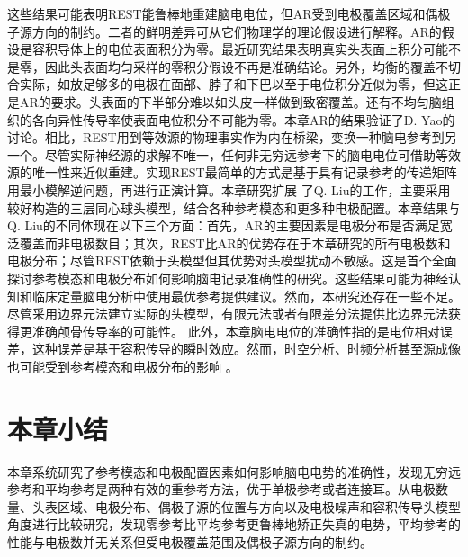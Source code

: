 这些结果可能表明REST能鲁棒地重建脑电电位，但AR受到电极覆盖区域和偶极子源方向的制约。二者的鲜明差异可从它们物理学的理论假设进行解释。AR的假设是容积导体上的电位表面积分为零。最近研究结果表明真实头表面上积分可能不是零，因此头表面均匀采样的零积分假设不再是准确结论。另外，均衡的覆盖不切合实际，如放足够多的电极在面部、脖子和下巴以至于电位积分近似为零，但这正是AR的要求。头表面的下半部分难以如头皮一样做到致密覆盖。还有不均匀脑组织的各向异性传导率使表面电位积分不可能为零。本章AR的结果验证了D. Yao的讨论。相比，REST用到等效源的物理事实作为内在桥梁，变换一种脑电参考到另一个。尽管实际神经源的求解不唯一，任何非无穷远参考下的脑电电位可借助等效源的唯一性来近似重建。实现REST最简单的方式是基于具有记录参考的传递矩阵用最小模解逆问题，再进行正演计算。本章研究扩展
了Q. Liu的工作，主要采用较好构造的三层同心球头模型，结合各种参考模态和更多种电极配置。本章结果与Q. Liu的不同体现在以下三个方面：首先，AR的主要因素是电极分布是否满足宽泛覆盖而非电极数目；其次，REST比AR的优势存在于本章研究的所有电极数和电极分布；尽管REST依赖于头模型但其优势对头模型扰动不敏感。这是首个全面探讨参考模态和电极分布如何影响脑电记录准确性的研究。这些结果可能为神经认知和临床定量脑电分析中使用最优参考提供建议。然而，本研究还存在一些不足。尽管采用边界元法建立实际的头模型，有限元法或者有限差分法提供比边界元法获得更准确颅骨传导率的可能性。 此外，本章脑电电位的准确性指的是电位相对误差，这种误差是基于容积传导的瞬时效应。然而，时空分析、时频分析甚至源成像也可能受到参考模态和电极分布的影响 。
\section{本章小结}
本章系统研究了参考模态和电极配置因素如何影响脑电电势的准确性，发现无穷远参考和平均参考是两种有效的重参考方法，优于单极参考或者连接耳。从电极数量、头表区域、电极分布、偶极子源的位置与方向以及电极噪声和容积传导头模型角度进行比较研究，发现零参考比平均参考更鲁棒地矫正失真的电势，平均参考的性能与电极数并无关系但受电极覆盖范围及偶极子源方向的制约。
